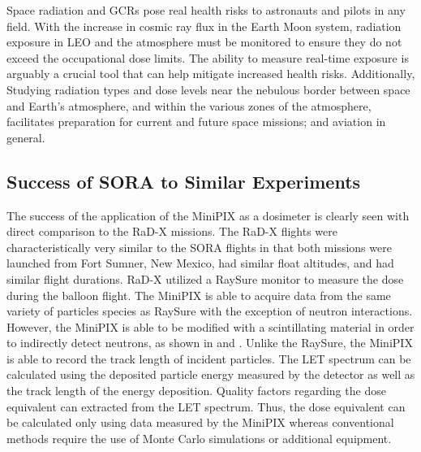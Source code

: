Space radiation and GCRs pose real health risks to astronauts and pilots in any field.  With the increase in cosmic ray flux in the Earth Moon system, radiation exposure in LEO and the atmosphere must be monitored to ensure they do not exceed the occupational dose limits.  The ability to measure real-time exposure is arguably a crucial tool that can help mitigate increased health risks.  Additionally, Studying radiation types and dose levels near the nebulous border between space and Earth's atmosphere, and within the various zones of the atmosphere, facilitates preparation for current and future space missions; and aviation in general. 




\subsection{Success of SORA to Similar Experiments}

The success of the application of the MiniPIX as a dosimeter is clearly seen with direct comparison to the RaD-X missions. The RaD-X flights were characteristically very similar to the SORA flights in that both missions were launched from Fort Sumner, New Mexico, had similar float altitudes, and had similar flight durations. RaD-X utilized a RaySure monitor to measure the dose during the balloon flight. The MiniPIX is able to acquire data from the same variety of particles species as RaySure with the exception of neutron interactions. However, the MiniPIX is able to be modified with a scintillating material in order to indirectly detect neutrons, as shown in \cite{medipix-neutron-scintillator-1} and \cite{medipix-neutron-scintillator-2}. Unlike the RaySure, the MiniPIX is able to record the track length of incident particles. The LET spectrum can be calculated using the deposited particle energy measured by the detector as well as the track length of the energy deposition. Quality factors regarding the dose equivalent can extracted from the LET spectrum. Thus, the dose equivalent can be calculated only using data measured by the MiniPIX whereas conventional methods require the use of Monte Carlo simulations \cite{stuartthesis} or additional equipment.   

